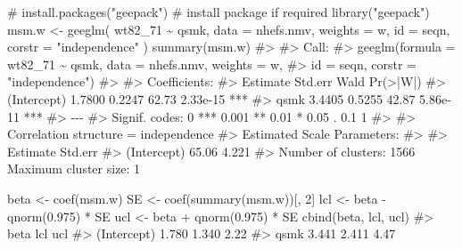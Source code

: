 \documentclass[
  10pt,
  a4paper,
]{book}
\newenvironment{Shaded}{\begin{snugshade}}{\end{snugshade}}
\newcommand{\AttributeTok}[1]{\textcolor[rgb]{0.40,0.45,0.13}{#1}}
\newcommand{\CommentTok}[1]{\textcolor[rgb]{0.37,0.37,0.37}{#1}}
\newcommand{\DecValTok}[1]{\textcolor[rgb]{0.68,0.00,0.00}{#1}}
\newcommand{\FloatTok}[1]{\textcolor[rgb]{0.68,0.00,0.00}{#1}}
\newcommand{\FunctionTok}[1]{\textcolor[rgb]{0.28,0.35,0.67}{#1}}
\newcommand{\NormalTok}[1]{\textcolor[rgb]{0.00,0.46,0.62}{#1}}
\newcommand{\OtherTok}[1]{\textcolor[rgb]{0.00,0.46,0.62}{#1}}
\newcommand{\SpecialCharTok}[1]{\textcolor[rgb]{0.37,0.37,0.37}{#1}}
\newcommand{\StringTok}[1]{\textcolor[rgb]{0.13,0.47,0.30}{#1}}
\begin{document}
\begin{Shaded}
\begin{Highlighting}[]
\CommentTok{\# install.packages("geepack") \# install package if required}
\FunctionTok{library}\NormalTok{(}\StringTok{"geepack"}\NormalTok{)}
\NormalTok{msm.w }\OtherTok{\textless{}{-}} \FunctionTok{geeglm}\NormalTok{(}
\NormalTok{  wt82\_71 }\SpecialCharTok{\textasciitilde{}}\NormalTok{ qsmk,}
  \AttributeTok{data =}\NormalTok{ nhefs.nmv,}
  \AttributeTok{weights =}\NormalTok{ w,}
  \AttributeTok{id =}\NormalTok{ seqn,}
  \AttributeTok{corstr =} \StringTok{"independence"}
\NormalTok{)}
\FunctionTok{summary}\NormalTok{(msm.w)}
\CommentTok{\#\textgreater{} }
\CommentTok{\#\textgreater{} Call:}
\CommentTok{\#\textgreater{} geeglm(formula = wt82\_71 \textasciitilde{} qsmk, data = nhefs.nmv, weights = w, }
\CommentTok{\#\textgreater{}     id = seqn, corstr = "independence")}
\CommentTok{\#\textgreater{} }
\CommentTok{\#\textgreater{}  Coefficients:}
\CommentTok{\#\textgreater{}             Estimate Std.err  Wald Pr(\textgreater{}|W|)    }
\CommentTok{\#\textgreater{} (Intercept)   1.7800  0.2247 62.73 2.33e{-}15 ***}
\CommentTok{\#\textgreater{} qsmk          3.4405  0.5255 42.87 5.86e{-}11 ***}
\CommentTok{\#\textgreater{} {-}{-}{-}}
\CommentTok{\#\textgreater{} Signif. codes:  0 \textquotesingle{}***\textquotesingle{} 0.001 \textquotesingle{}**\textquotesingle{} 0.01 \textquotesingle{}*\textquotesingle{} 0.05 \textquotesingle{}.\textquotesingle{} 0.1 \textquotesingle{} \textquotesingle{} 1}
\CommentTok{\#\textgreater{} }
\CommentTok{\#\textgreater{} Correlation structure = independence }
\CommentTok{\#\textgreater{} Estimated Scale Parameters:}
\CommentTok{\#\textgreater{} }
\CommentTok{\#\textgreater{}             Estimate Std.err}
\CommentTok{\#\textgreater{} (Intercept)    65.06   4.221}
\CommentTok{\#\textgreater{} Number of clusters:   1566  Maximum cluster size: 1}

\NormalTok{beta }\OtherTok{\textless{}{-}} \FunctionTok{coef}\NormalTok{(msm.w)}
\NormalTok{SE }\OtherTok{\textless{}{-}} \FunctionTok{coef}\NormalTok{(}\FunctionTok{summary}\NormalTok{(msm.w))[, }\DecValTok{2}\NormalTok{]}
\NormalTok{lcl }\OtherTok{\textless{}{-}}\NormalTok{ beta }\SpecialCharTok{{-}} \FunctionTok{qnorm}\NormalTok{(}\FloatTok{0.975}\NormalTok{) }\SpecialCharTok{*}\NormalTok{ SE}
\NormalTok{ucl }\OtherTok{\textless{}{-}}\NormalTok{ beta }\SpecialCharTok{+} \FunctionTok{qnorm}\NormalTok{(}\FloatTok{0.975}\NormalTok{) }\SpecialCharTok{*}\NormalTok{ SE}
\FunctionTok{cbind}\NormalTok{(beta, lcl, ucl)}
\CommentTok{\#\textgreater{}              beta   lcl  ucl}
\CommentTok{\#\textgreater{} (Intercept) 1.780 1.340 2.22}
\CommentTok{\#\textgreater{} qsmk        3.441 2.411 4.47}


\end{Highlighting}
\end{Shaded}
\end{document}
